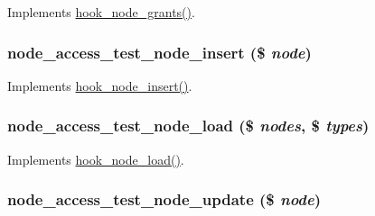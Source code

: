 Implements \hyperlink{group__node__access_gaa973f2ab6ab14c3fa14e5138c6d69ecf}{hook\_\-node\_\-grants()}. \hypertarget{node__access__test_8module_afb11c51940388ec9b43c605f27896573}{
\subsubsection[{node\_\-access\_\-test\_\-node\_\-insert}]{\setlength{\rightskip}{0pt plus 5cm}node\_\-access\_\-test\_\-node\_\-insert (\$ {\em node})}}
\label{node__access__test_8module_afb11c51940388ec9b43c605f27896573}
Implements \hyperlink{group__node__api__hooks_ga8b40dc62e46e5055c205d2a723dc3548}{hook\_\-node\_\-insert()}. \hypertarget{node__access__test_8module_aaeaad51d410d2cd92ff9f9d653096c8d}{
\subsubsection[{node\_\-access\_\-test\_\-node\_\-load}]{\setlength{\rightskip}{0pt plus 5cm}node\_\-access\_\-test\_\-node\_\-load (\$ {\em nodes}, \/  \$ {\em types})}}
\label{node__access__test_8module_aaeaad51d410d2cd92ff9f9d653096c8d}
Implements \hyperlink{group__node__api__hooks_gad48bb14b68ed38526029d1f7ac2d2de4}{hook\_\-node\_\-load()}. \hypertarget{node__access__test_8module_a29f378c85be54f81cb706c9638a1ea07}{
\subsubsection[{node\_\-access\_\-test\_\-node\_\-update}]{\setlength{\rightskip}{0pt plus 5cm}node\_\-access\_\-test\_\-node\_\-update (\$ {\em node})}}
\label{node__access__test_8module_a29f378c85be54f81cb706c9638a1ea07}
